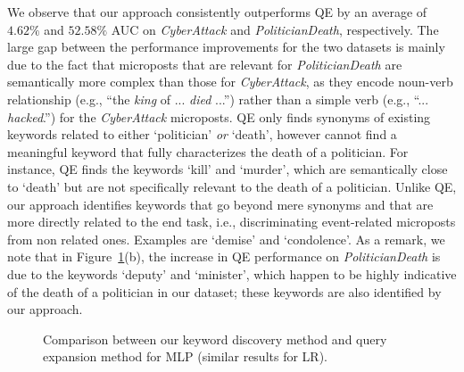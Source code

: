 \documentclass[letterpaper]{article}
\begin{document}
We observe that our approach consistently outperforms QE by an average of $4.62\%$ and $52.58\%$ AUC on \emph{CyberAttack} and \emph{PoliticianDeath}, respectively. The large gap between the performance improvements for the two datasets is mainly due to the fact that microposts that are relevant for \emph{PoliticianDeath} are semantically more complex than those for \emph{CyberAttack}, as they encode noun-verb relationship (e.g., ``the \emph{king} of ... \emph{died} ...'') rather than a simple verb (e.g., ``... \emph{hacked}.'') for the \emph{CyberAttack} microposts. QE only finds synonyms of existing keywords related to either \lq politician' \emph{or} \lq death', however cannot find a meaningful keyword that fully characterizes the death of a politician. For instance, QE finds the keywords \lq kill' and \lq murder', which are semantically close to \lq death' but are not specifically relevant to the death of a politician. Unlike QE, our approach identifies keywords that go beyond mere synonyms and that are more directly related to the end task, i.e., discriminating event-related microposts from non related ones. Examples are \lq demise' and \lq condolence'. As a remark, we note that in Figure~\ref{fig:Q2}(b), the increase in QE performance on \emph{PoliticianDeath} is due to the keywords \lq deputy' and \lq minister', which happen to be highly indicative of the death of a politician in our dataset; these keywords are also identified by our approach.


\begin{figure}[t!]
        \centering
        \caption{Comparison between our keyword discovery method and query expansion method for MLP (similar results for LR).}
        \label{fig:Q2}
\end{figure}
\end{document}
